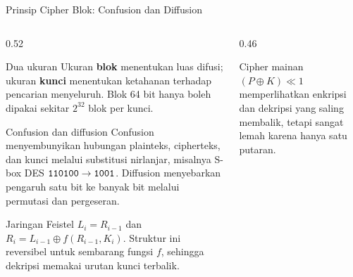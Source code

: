 \documentclass[aspectratio=169,11pt]{beamer}
\begin{document}
\begin{frame}{Prinsip Cipher Blok: Confusion dan Diffusion}
    \begin{columns}[T,onlytextwidth]
        \begin{column}{0.52\textwidth}
            \scriptsize
            \begin{block}{Dua ukuran}
                Ukuran \textbf{blok} menentukan luas difusi; ukuran
                \textbf{kunci} menentukan ketahanan terhadap pencarian
                menyeluruh. Blok 64 bit hanya boleh dipakai sekitar $2^{32}$
                blok per kunci.
            \end{block}
            \begin{block}{Confusion dan diffusion}
                Confusion menyembunyikan hubungan plainteks, cipherteks, dan
                kunci melalui substitusi nirlanjar, misalnya S-box DES
                $\texttt{110100}\to\texttt{1001}$. Diffusion menyebarkan pengaruh
                satu bit ke banyak bit melalui permutasi dan pergeseran.
            \end{block}
            \begin{alertblock}{Jaringan Feistel}
                $L_i=R_{i-1}$ dan $R_i=L_{i-1}\oplus f(R_{i-1},K_i)$.
                Struktur ini reversibel untuk sembarang fungsi $f$, sehingga
                dekripsi memakai urutan kunci terbalik.
            \end{alertblock}
        \end{column}
        \begin{column}{0.46\textwidth}
            \centering
            \vspace{0.1cm}
            \begin{exampleblock}{Cipher mainan}
                \footnotesize
                $(P \oplus K) \ll 1$ memperlihatkan enkripsi dan dekripsi yang
                saling membalik, tetapi sangat lemah karena hanya satu putaran.
            \end{exampleblock}
        \end{column}
    \end{columns}
\end{frame}
\end{document}
